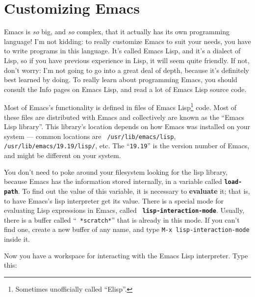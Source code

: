 \section{Customizing Emacs}



        Emacs is {\em so} big, and {\em so} complex, that it actually
has its own programming language!  I'm not kidding: to really
customize Emacs to suit your needs, you have to write programs in this
language.  It's called Emacs Lisp, and it's a dialect of Lisp, so if
you have previous experience in Lisp, it will seem quite friendly.  If
not, don't worry: I'm not going to go into a great deal of depth,
because it's definitely best learned by doing.  To really learn about
programming Emacs, you should consult the Info pages on Emacs Lisp,
and read a lot of Emacs Lisp source code.

Most of Emacs's functionality is defined in files of Emacs
Lisp\footnote{Sometimes unofficially called ``Elisp''.} code.  Most of
these files are distributed with Emacs and collectively are known as
the ``Emacs Lisp library''.  This library's location depends on how
Emacs was installed on your system --- common locations are {\tt
  /usr/lib/emacs/lisp}, {\tt /usr/lib/emacs/19.19/lisp/}, etc.  The
``{\tt 19.19}'' is the version number of Emacs, and might be different
on your system.

        You don't need to poke around your filesystem looking for the
lisp library, because Emacs has the information stored internally, in
a variable called {\tt\bf load-path}.  To find out the value of this
variable, it is necessary to {\bf evaluate} it; that is, to have
Emacs's lisp interpreter get its value.  There is a special mode for
evaluating Lisp expressions in Emacs, called {\tt\bf
lisp-interaction-mode}.  Usually, there is a buffer called ``{\tt
*scratch*}'' that is already in this mode.  If you can't find one,
create a new buffer of any name, and type {\tt M-x
lisp-interaction-mode} inside it.

        Now you have a workspace for interacting with the Emacs Lisp
interpreter.  Type this:


